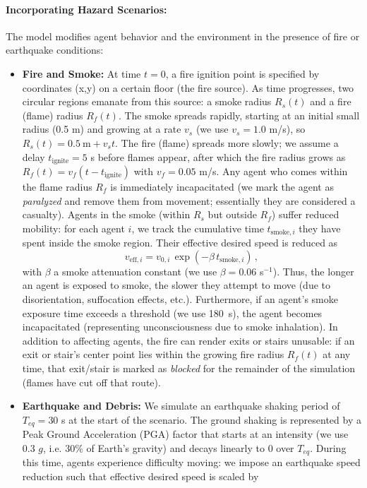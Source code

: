 \documentclass[11pt,a4paper]{article}
\begin{document}
\paragraph{Incorporating Hazard Scenarios:} The model modifies agent behavior and the environment in the presence of fire or earthquake conditions:
\begin{itemize}
    \item \textbf{Fire and Smoke:} At time $t=0$, a fire ignition point is specified by coordinates (x,y) on a certain floor (the fire source). As time progresses, two circular regions emanate from this source: a smoke radius $R_s(t)$ and a fire (flame) radius $R_f(t)$. The smoke spreads rapidly, starting at an initial small radius (0.5 m) and growing at a rate $v_s$ (we use $v_s = 1.0$ m/s), so $R_s(t) = 0.5~\text{m} + v_s t$. The fire (flame) spreads more slowly; we assume a delay $t_{\text{ignite}} = 5$ s before flames appear, after which the fire radius grows as $R_f(t) = v_f (t - t_{\text{ignite}})$ with $v_f = 0.05$ m/s. Any agent who comes within the flame radius $R_f$ is immediately incapacitated (we mark the agent as \textit{paralyzed} and remove them from movement; essentially they are considered a casualty). Agents in the smoke (within $R_s$ but outside $R_f$) suffer reduced mobility: for each agent $i$, we track the cumulative time $t_{\text{smoke},i}$ they have spent inside the smoke region. Their effective desired speed is reduced as \cite{Gwynne1999}
    \begin{equation}
       v_{\text{eff},i} = v_{0,i}\,\exp(-\beta\, t_{\text{smoke},i})\,,
    \end{equation}
    with $\beta$ a smoke attenuation constant (we use $\beta = 0.06$ s$^{-1}$). Thus, the longer an agent is exposed to smoke, the slower they attempt to move (due to disorientation, suffocation effects, etc.). Furthermore, if an agent's smoke exposure time exceeds a threshold (we use 180~s), the agent becomes incapacitated (representing unconsciousness due to smoke inhalation). In addition to affecting agents, the fire can render exits or stairs unusable: if an exit or stair's center point lies within the growing fire radius $R_f(t)$ at any time, that exit/stair is marked as \textit{blocked} for the remainder of the simulation (flames have cut off that route).
    \item \textbf{Earthquake and Debris:} We simulate an earthquake shaking period of $T_{eq}=30$ s at the start of the scenario. The ground shaking is represented by a Peak Ground Acceleration (PGA) factor that starts at an intensity (we use 0.3 $g$, i.e. 30\% of Earth's gravity) and decays linearly to 0 over $T_{eq}$. During this time, agents experience difficulty moving: we impose an earthquake speed reduction such that effective desired speed is scaled by \cite{Yang2024}

\end{itemize}
\end{document}
